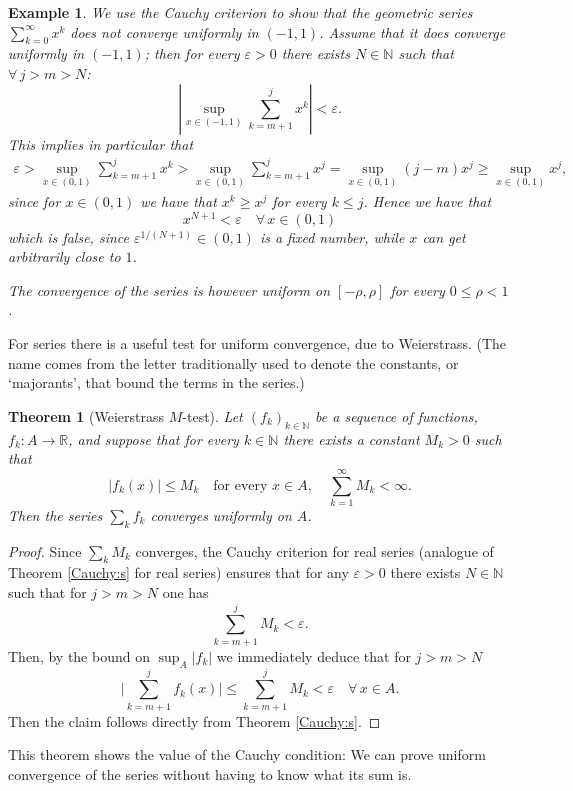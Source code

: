 \documentclass[a4paper,reqno]{amsart}
\numberwithin{equation}{section}
\newtheorem{theorem}[definition]{Theorem}
\newtheorem{example}{Example}
\def\N{\mathbb{N}}
\def\R{\mathbb{R}}
\begin{document}
\begin{example}\label{Cauchy:gs}
We use the Cauchy criterion to show that the geometric series $\sum_{k=0}^\infty x^k$ does not converge uniformly in $(-1,1)$. Assume that it does converge uniformly in $(-1,1)$; then for every
$\varepsilon>0$ there exists $N\in \N$ such that $\forall\, j>m> N$:
$$
\left| \sup_{x\in (-1,1)} \sum_{k=m+1}^j x^k \right| <\varepsilon.
$$
This implies in particular that
\begin{align*}
\varepsilon > \sup_{x\in (0,1)} \sum_{k=m+1}^j x^k > \sup_{x\in (0,1)} \sum_{k=m+1}^j x^j = \sup_{x\in (0,1)} (j-m) x^j \geq \sup_{x\in (0,1)}x^j,
\end{align*}
since for $x\in (0,1)$ we have that $x^k \geq x^j$ for every $k\leq j$. Hence we have that
$$
x^{N+1} < \varepsilon \quad \forall\, x\in (0,1)
$$
which is false, since $\varepsilon^{1/(N+1)}\in (0,1)$ is a fixed number, while $x$ can get arbitrarily close to $1$.

The convergence of the series is however uniform on $[-\rho,\rho]$ for every $0\leq \rho<1$.
\end{example}


For series there is a useful test for uniform convergence, due to Weierstrass. (The name comes from the letter traditionally used to denote the constants, or `majorants', that bound the terms in the series.)

\begin{theorem}[Weierstrass $M$-test]
Let $(f_k)_{k\in \mathbb{N}}$ be a sequence of functions, $f_k:A\to \R$, and suppose that for every $k\in \N$ there exists a constant $M_k>0$ such that
$$
|f_k(x)| \leq M_k \quad \textrm{for every } x\in A, \quad \sum_{k=1}^\infty M_k <\infty.
$$
Then the series $\sum_k f_k$ converges uniformly on $A$.
\end{theorem}

\begin{proof}
Since $\sum_k M_k$ converges, the Cauchy criterion for real series (analogue of Theorem \ref{Cauchy:s} for real series) ensures that for any $\varepsilon>0$ there exists $N\in \N$ such that for $j>m>N$ one has
$$
\sum_{k=m+1}^j M_k < \varepsilon.
$$
Then, by the bound on $\sup_A|f_k|$ we immediately deduce that for $j>m>N$
$$
\Bigg| \sum_{k=m+1}^j f_k(x)\Bigg| \leq \sum_{k=m+1}^j M_k < \varepsilon \quad \forall\, x\in A.
$$
Then the claim follows directly from Theorem \ref{Cauchy:s}.
\end{proof}

This theorem shows the value of the Cauchy condition: We can prove uniform convergence of the series without having to know what its sum is.
\end{document}
